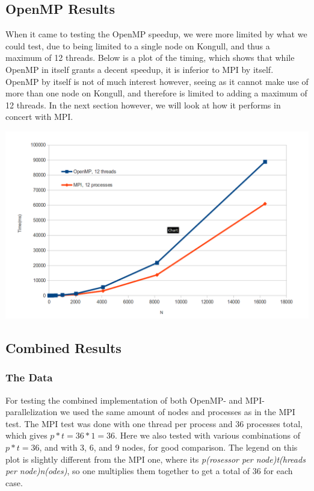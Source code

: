 \documentclass[fontsize=11pt,paper=a4,titlepage]{article}
\begin{document}
\newpage
\subsection{OpenMP Results}
When it came to testing the OpenMP speedup, we were more limited by what we could test, due to being limited to a single node on Kongull, and thus a maximum of 12 threads. Below is a plot of the timing, which shows that while OpenMP in itself grants a decent speedup, it is inferior to MPI by itself. OpenMP by itself is not of much interest however, seeing as it cannot make use of more than one node on Kongull, and therefore is limited to adding a maximum of 12 threads. In the next section however, we will look at how it performs in concert with MPI.

\hspace*{-1.7cm}\includegraphics[scale=0.6]{pics/omp.png}
\newpage
\subsection{Combined Results}
\subsubsection{The Data}
For testing the combined implementation of both OpenMP- and MPI-parallelization we used the same amount of nodes and processes as in the MPI test. The MPI test was done with one thread per process and 36 processes total, which gives $p*t = 36*1 = 36$. Here we also tested with various combinations of $p*t=36$, and with 3, 6, and 9 nodes, for good comparison. The legend on this plot is slightly different from the MPI one, where its \emph{p(rosessor per node)t(hreads per node)n(odes)}, so one multiplies them together to get a total of 36 for each case.
\end{document}

